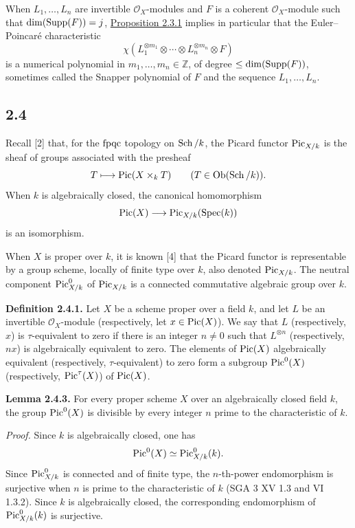 When $L_1,\ldots,L_n$ are invertible $\mathcal O_X$-modules and $F$ is a
coherent $\mathcal O_X$-module such that $\dim(\operatorname{Supp}(F))=j$, \hyperlink{sga6.e10.prop.2-3-1}{Proposition
2.3.1} implies in particular that the Euler--Poincar\'e characteristic
\begin{equation}\tag{2.3.2}
\chi(L_1^{\otimes m_1}\otimes\cdots\otimes
L_n^{\otimes m_n}\otimes F)
\end{equation}
is a numerical polynomial in $m_1,\ldots,m_n\in\mathbb Z$, of degree
$\leq\dim(\operatorname{Supp}(F))$, sometimes called the Snapper polynomial of $F$ and
the sequence $L_1,\ldots,L_n$.

\subsection*{2.4}
Recall [2] that, for the $\mathrm{fpqc}$ topology on $\operatorname{Sch}/k$, the Picard functor
$\operatorname{Pic}_{X/k}$ is the sheaf of groups associated with the presheaf
\[
T\longmapsto\operatorname{Pic}(X\times_kT)
\qquad(T\in\operatorname{Ob}(\operatorname{Sch}/k)).
\]
When $k$ is algebraically closed, the canonical homomorphism
\[
\operatorname{Pic}(X)\longrightarrow\operatorname{Pic}_{X/k}(\operatorname{Spec}(k))
\]
is an isomorphism.

When $X$ is proper over $k$, it is known [4] that the Picard functor is
representable by a group scheme, locally of finite type over $k$, also denoted
$\operatorname{Pic}_{X/k}$. The neutral component $\operatorname{Pic}^0_{X/k}$ of $\operatorname{Pic}_{X/k}$ is a
connected commutative algebraic group over $k$.

\textbf{Definition 2.4.1.}
Let $X$ be a scheme proper over a field $k$, and let $L$ be an invertible
$\mathcal O_X$-module (respectively, let $x\in\operatorname{Pic}(X)$). We say that $L$
(respectively, $x$) is $\tau$-equivalent to zero if there is an integer
$n\ne0$ such that $L^{\otimes n}$ (respectively, $nx$) is algebraically
equivalent to zero. The elements of $\operatorname{Pic}(X)$ algebraically equivalent
(respectively, $\tau$-equivalent) to zero form a subgroup $\operatorname{Pic}^0(X)$
(respectively, $\operatorname{Pic}^\tau(X)$) of $\operatorname{Pic}(X)$.

\textbf{Lemma 2.4.3.}
For every proper scheme $X$ over an algebraically closed field $k$, the group
$\operatorname{Pic}^0(X)$ is divisible by every integer $n$ prime to the characteristic of
$k$.

\emph{Proof.}
Since $k$ is algebraically closed, one has
\[
\operatorname{Pic}^0(X)\simeq\operatorname{Pic}^0_{X/k}(k).
\]
Since $\operatorname{Pic}^0_{X/k}$ is connected and of finite type, the $n$-th-power
endomorphism is surjective when $n$ is prime to the characteristic of $k$
(SGA 3 XV 1.3 and VI 1.3.2). Since $k$ is algebraically closed, the
corresponding endomorphism of $\operatorname{Pic}^0_{X/k}(k)$ is surjective.

